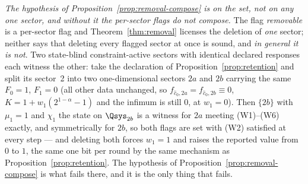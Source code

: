 
\begin{remark}\label{rem:removal-sets}
\emph{The hypothesis of Proposition~\ref{prop:removal-compose} is on the
\emph{set}, not on any one sector, and without it the per-sector flags do
not compose.} The flag \emph{removable} is a per-sector flag and
Theorem~\ref{thm:removal} licenses the deletion of \emph{one} sector;
neither says that deleting every flagged sector at once is sound, and
\emph{in general it is not}. Two state-blind
constraint-active sectors with identical declared
responses each witness the other: take the declaration of
Proposition~\ref{prop:retention} and split its sector~2 into two
one-dimensional sectors $2a$ and $2b$ carrying the same $F_0=1$, $F_1=0$
(all other data unchanged, so $f_{\hat c_0,2a}=f_{\hat c_0,2b}\equiv0$,
$K=1+w_1(2^{1-\alpha}-1)$ and the infimum is still $0$, at $w_1=0$). Then
$\{2b\}$ with $\mu_1=1$ and $\chi_1$ the state on $\Qsys_{2b}$ is a
witness for $2a$ meeting (W1)--(W6) exactly, and symmetrically for $2b$,
so both flags are set with (W2) satisfied at every step --- and deleting
both forces $w_1=1$ and raises the reported value from $0$ to $1$, the
same one bit per round by the same mechanism as
Proposition~\ref{prop:retention}. The hypothesis of
Proposition~\ref{prop:removal-compose} is what fails there, and it is the
only thing that fails.


\end{remark}
